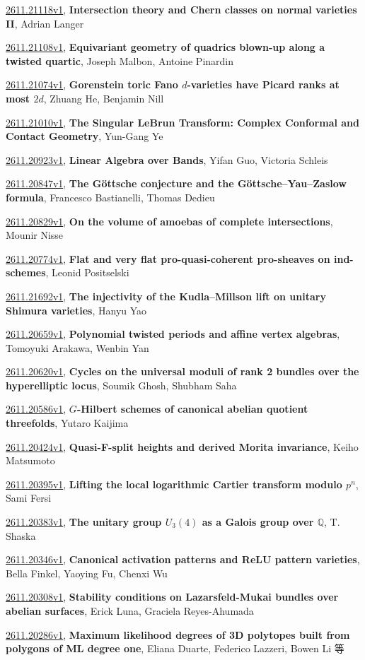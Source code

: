 \documentclass[9pt, a4paper]{article}
\theoremstyle{plain}
\theoremstyle{definition}
\theoremstyle{remark}
\newcommand{\arxiv}[3]{\href{https://arxiv.org/abs/#1}{#1}, \textbf{\textcolor{arxivblue}{#2}}, #3}
\begin{document}
\arxiv{2611.21118v1}{Intersection theory and Chern classes on normal varieties II}{Adrian Langer}

\arxiv{2611.21108v1}{Equivariant geometry of quadrics blown-up along a twisted quartic}{Joseph Malbon, Antoine Pinardin}

\arxiv{2611.21074v1}{Gorenstein toric Fano $d$-varieties have Picard ranks at most $2d$}{Zhuang He, Benjamin Nill}

\arxiv{2611.21010v1}{The Singular LeBrun Transform: Complex Conformal and Contact Geometry}{Yun-Gang Ye}

\arxiv{2611.20923v1}{Linear Algebra over Bands}{Yifan Guo, Victoria Schleis}

\arxiv{2611.20847v1}{The Göttsche conjecture and the Göttsche--Yau--Zaslow formula}{Francesco Bastianelli, Thomas Dedieu}

\arxiv{2611.20829v1}{On the volume of amoebas of complete intersections}{Mounir Nisse}

\arxiv{2611.20774v1}{Flat and very flat pro-quasi-coherent pro-sheaves on ind-schemes}{Leonid Positselski}

\arxiv{2611.21692v1}{The injectivity of the Kudla--Millson lift on unitary Shimura varieties}{Hanyu Yao}

\arxiv{2611.20659v1}{Polynomial twisted periods and affine vertex algebras}{Tomoyuki Arakawa, Wenbin Yan}

\arxiv{2611.20620v1}{Cycles on the universal moduli of rank 2 bundles over the hyperelliptic locus}{Soumik Ghosh, Shubham Saha}

\arxiv{2611.20586v1}{$G$-Hilbert schemes of canonical abelian quotient threefolds}{Yutaro Kaijima}

\arxiv{2611.20424v1}{Quasi-F-split heights and derived Morita invariance}{Keiho Matsumoto}

\arxiv{2611.20395v1}{Lifting the local logarithmic Cartier transform modulo $p^n$}{Sami Fersi}

\arxiv{2611.20383v1}{The unitary group $U_3(4)$ as a Galois group over $\mathbb{Q}$}{T. Shaska}

\arxiv{2611.20346v1}{Canonical activation patterns and ReLU pattern varieties}{Bella Finkel, Yaoying Fu, Chenxi Wu}

\arxiv{2611.20308v1}{Stability conditions on Lazarsfeld-Mukai bundles over abelian surfaces}{Erick Luna, Graciela Reyes-Ahumada}

\arxiv{2611.20286v1}{Maximum likelihood degrees of 3D polytopes built from polygons of ML degree one}{Eliana Duarte, Federico Lazzeri, Bowen Li 等}
\end{document}
